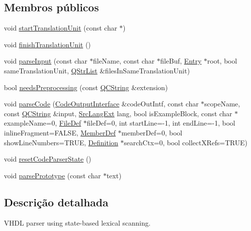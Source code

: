 \subsection*{Membros públicos}
\begin{DoxyCompactItemize}
\item 
void \hyperlink{class_v_h_d_l_language_scanner_a9179d0b9461d5d683468fb6015d1643f}{start\-Translation\-Unit} (const char $\ast$)
\item 
void \hyperlink{class_v_h_d_l_language_scanner_a245c1fbfb8ba359e61d832c4e7c6c98e}{finish\-Translation\-Unit} ()
\item 
void \hyperlink{class_v_h_d_l_language_scanner_ab1ed2c75b61719cec6060b9f69419743}{parse\-Input} (const char $\ast$file\-Name, const char $\ast$file\-Buf, \hyperlink{class_entry}{Entry} $\ast$root, bool same\-Translation\-Unit, \hyperlink{class_q_str_list}{Q\-Str\-List} \&files\-In\-Same\-Translation\-Unit)
\item 
bool \hyperlink{class_v_h_d_l_language_scanner_ac49a959c40c82385233e4c75163e39ae}{needs\-Preprocessing} (const \hyperlink{class_q_c_string}{Q\-C\-String} \&extension)
\item 
void \hyperlink{class_v_h_d_l_language_scanner_ac614074ea2c569cabd265a6168ad36d2}{parse\-Code} (\hyperlink{class_code_output_interface}{Code\-Output\-Interface} \&code\-Out\-Intf, const char $\ast$scope\-Name, const \hyperlink{class_q_c_string}{Q\-C\-String} \&input, \hyperlink{types_8h_a9974623ce72fc23df5d64426b9178bf2}{Src\-Lang\-Ext} lang, bool is\-Example\-Block, const char $\ast$example\-Name=0, \hyperlink{class_file_def}{File\-Def} $\ast$file\-Def=0, int start\-Line=-\/1, int end\-Line=-\/1, bool inline\-Fragment=F\-A\-L\-S\-E, \hyperlink{class_member_def}{Member\-Def} $\ast$member\-Def=0, bool show\-Line\-Numbers=T\-R\-U\-E, \hyperlink{class_definition}{Definition} $\ast$search\-Ctx=0, bool collect\-X\-Refs=T\-R\-U\-E)
\item 
void \hyperlink{class_v_h_d_l_language_scanner_a5d8e0ded4118b6eff98aa23eb64db02c}{reset\-Code\-Parser\-State} ()
\item 
void \hyperlink{class_v_h_d_l_language_scanner_a022344e4fa95056a941a9e8c02334872}{parse\-Prototype} (const char $\ast$text)
\end{DoxyCompactItemize}


\subsection{Descrição detalhada}
V\-H\-D\-L parser using state-\/based lexical scanning.

